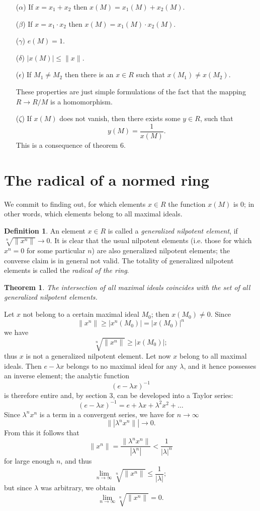 \documentclass{article}
\newtheorem{theorem}{Theorem}
\theoremstyle{definition}
\newtheorem*{definition}{Definition}
\begin{document}
\begin{enumerate}
\item [($\alpha$)] If $x=x_1+x_2$ then $x(M)=x_1(M)+x_2(M)$.
\item [($\beta$)] If $x=x_1\cdot x_2$ then $x(M)=x_1(M)\cdot x_2(M)$.
\item [($\gamma$)] $e(M)=1$.
\item [($\delta$)] $|x(M)| \leq \|x\|$.
\item [($\epsilon$)] If $M_1\neq M_2$ then there is an $x\in R$ such that $x(M_1)\neq x(M_2)$.

  These properties are just simple formulations of the fact that the mapping $R\to R/M$ is a homomorphism.
\item [($\zeta$)] If $x(M)$ does not vanish, then there exists some $y\in R$, such that $$ y(M) = \frac1{x(M)}.$$ This is a consequence of theorem 6.
\end{enumerate}

\section{The radical of a normed ring}
We commit to finding out, for which elements $x\in R$ the function $x(M)$ is 0; in other words, which elements belong to all maximal ideals.

\begin{definition}
  An element $x\in R$ is called a \emph{generalized nilpotent element}, if $\sqrt[n]{\|x^n\|} \to 0$. It is clear that the usual nilpotent elements (i.e. those for which $x^n = 0$ for some particular $n$) are also generalized nilpotent elements; the converse claim is in general not valid. The totality of generalized nilpotent elements is called the \emph{radical of the ring}.
\end{definition}

\begin{theorem}
  The intersection of all maximal ideals coincides with the set of all generalized nilpotent elements.
\end{theorem}

Let $x$ not belong to a certain maximal ideal $M_0$; then $x(M_0)\neq0$. Since
$$ \|x^n\| \geq |x^n(M_0)| = |x(M_0)|^n $$
we have
$$ \sqrt[n]{\|x^n\|} \geq |x(M_0)|; $$
thus $x$ is not a generalized nilpotent element. Let now $x$ belong to all maximal ideals. Then $e-\lambda x$ belongs to no maximal ideal for any $\lambda$, and it hence possesses an inverse element; the analytic function
$$ (e-\lambda x)^{-1} $$
is therefore entire and, by section 3, can be developed into a Taylor series:
$$ (e-\lambda x)^{-1}  = e + \lambda x + \lambda^2 x^2 + \dots $$
Since $\lambda^n x^n$ is a term in a convergent series, we have for $n\to\infty$
$$ \||\lambda^n x^n\|| \to 0. $$
From this it follows that
$$ \|x^n\| = \frac{\|\lambda^nx^n\|}{|\lambda^n|} < \frac1{|\lambda|^n} $$
for large enough $n$, and thus
$$ \lim_{n\to\infty}\sqrt[n]{\|x^n\|} \leq \frac1{|\lambda|}; $$
but since $\lambda$ was arbitrary, we obtain
$$ \lim_{n\to\infty}\sqrt[n]{\|x^n\|} = 0. $$
\end{document}
